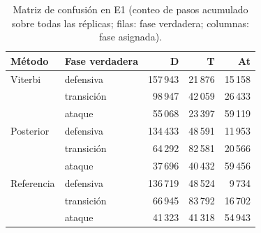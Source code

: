 \begin{table}[ht]
\centering
\caption{Matriz de confusión en E1 (conteo de pasos acumulado sobre todas las réplicas; filas: fase verdadera; columnas: fase asignada).}
\label{tab:conf}
\small
\begin{tabular}{llrrr}
\toprule
Método & Fase verdadera & D & T & At \\
\midrule
Viterbi & defensiva & 157\,943 & 21\,876 & 15\,158 \\
 & transición & 98\,947 & 42\,059 & 26\,433 \\
 & ataque & 55\,068 & 23\,397 & 59\,119 \\
\midrule
Posterior & defensiva & 134\,433 & 48\,591 & 11\,953 \\
 & transición & 64\,292 & 82\,581 & 20\,566 \\
 & ataque & 37\,696 & 40\,432 & 59\,456 \\
\midrule
Referencia & defensiva & 136\,719 & 48\,524 & 9\,734 \\
 & transición & 66\,945 & 83\,792 & 16\,702 \\
 & ataque & 41\,323 & 41\,318 & 54\,943 \\
\bottomrule
\end{tabular}
\end{table}
